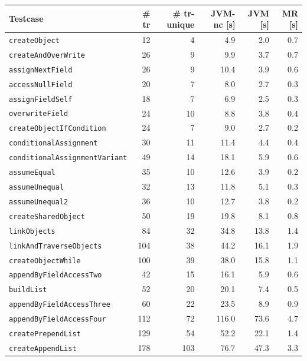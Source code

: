 \documentclass[11pt,a4paper,english]{article}
\begin{document}
\begin{table}   
  \small
  \centering
  \begin{tabular}{|l|r|r|r|r|r|}
    \hline
    \textbf{Testcase} & \textbf{\# tr} & \textbf{\# tr-unique} & \textbf{JVM-nc [s] }& \textbf{JVM [s] }& \textbf{MR [s] }\\
    \hline
    \texttt{createObject} & 12 & 4 & 4.9 & 2.0 & 0.7 \\ 
    \texttt{createAndOverWrite} & 26 & 9 & 9.9 & 3.7 & 0.7 \\ 
    \texttt{assignNextField} & 26 & 9 & 10.4 & 3.9 & 0.6 \\ 
    \texttt{accessNullField} & 20 & 7 & 8.0 & 2.7 & 0.3 \\ 
    \texttt{assignFieldSelf} & 18 & 7 & 6.9 & 2.5 & 0.3 \\ 
    \texttt{overwriteField} & 24 & 10 & 8.8 & 3.8 & 0.4 \\ 
    \texttt{createObjectIfCondition} & 24 & 7 & 9.0 & 2.7 & 0.2 \\ 
    \texttt{conditionalAssignment} & 30 & 11 & 11.4 & 4.4 & 0.4 \\ 
    \texttt{conditionalAssignmentVariant} & 49 & 14 & 18.1 & 5.9 & 0.6 \\ 
    \texttt{assumeEqual} & 35 & 10 & 12.6 & 3.9 & 0.2 \\ 
    \texttt{assumeUnequal} & 32 & 13 & 11.8 & 5.1 & 0.3 \\ 
    \texttt{assumeUnequal2} & 36 & 10 & 12.7 & 3.8 & 0.2 \\ 
    \texttt{createSharedObject} & 50 & 19 & 19.8 & 8.1 & 0.8 \\ 
    \texttt{linkObjects} & 84 & 32 & 34.8 & 13.8 & 1.4 \\ 
    \texttt{linkAndTraverseObjects} & 104 & 38 & 44.2 & 16.1 & 1.9 \\ 
    \texttt{createObjectWhile} & 100 & 39 & 38.0 & 15.8 & 1.1 \\ 
    \texttt{appendByFieldAccessTwo} & 42 & 15 & 16.1 & 5.9 & 0.6 \\ 
    \texttt{buildList} & 52 & 20 & 20.1 & 7.4 & 0.5 \\ 
    \texttt{appendByFieldAccessThree} & 60 & 22 & 23.5 & 8.9 & 0.9 \\ 
    \texttt{appendByFieldAccessFour} & 112 & 72 & 116.0 & 73.6 & 4.7 \\ 
    \texttt{createPrependList} & 129 & 54 & 52.2 & 22.1 & 1.4 \\ 
    \texttt{createAppendList} & 178 & 103 & 76.7 & 47.3 & 3.3 \\ 

\end{tabular}
\end{table}
\end{document}

